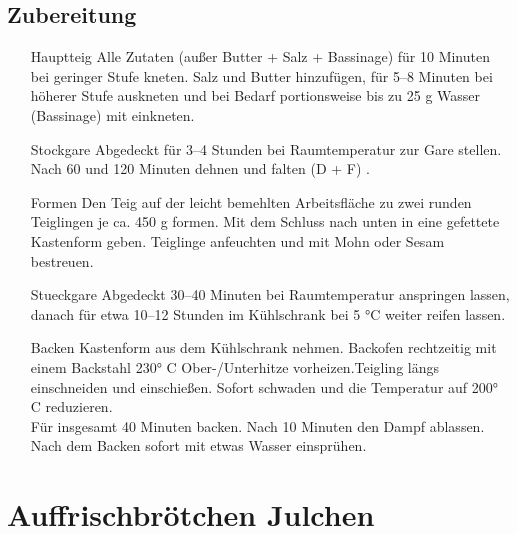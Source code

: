 \subsection*{Zubereitung}
\begin{enumerate}
    \item  [\Gls{Hauptteig}]  Alle Zutaten (außer Butter + Salz + Bassinage) für 10 Minuten bei geringer Stufe kneten. Salz und Butter hinzufügen, für 5–8 Minuten bei höherer Stufe auskneten und bei Bedarf portionsweise bis zu 25 g     Wasser (Bassinage) mit einkneten.
    \item [\Gls{Stockgare}] Abgedeckt für 3–4 Stunden bei Raumtemperatur zur Gare stellen. Nach 60 und 120 Minuten dehnen und falten (D + F) . 
    \item [\Gls{Formen}] Den Teig auf der leicht bemehlten Arbeitsfläche zu zwei runden Teiglingen je ca. 450 g formen. Mit dem Schluss nach unten in eine gefettete Kastenform geben. Teiglinge anfeuchten und mit Mohn oder Sesam bestreuen.
    \item [\Gls{Stueckgare}] Abgedeckt 30–40 Minuten bei Raumtemperatur anspringen lassen, danach für etwa 10–12 Stunden im Kühlschrank bei 5 °C weiter reifen lassen.
    \item [\Gls{Backen}] Kastenform aus dem Kühlschrank nehmen. Backofen rechtzeitig mit einem Backstahl 230° C Ober-/Unterhitze vorheizen.Teigling längs einschneiden und einschießen. Sofort schwaden und die Temperatur auf 200° C reduzieren.\\ 
    Für insgesamt 40 Minuten backen. Nach 10 Minuten den Dampf ablassen. Nach dem Backen sofort mit etwas Wasser einsprühen.   
\end{enumerate}




\section{Auffrischbrötchen Julchen}  
\cite{sonjajulchen2022}
